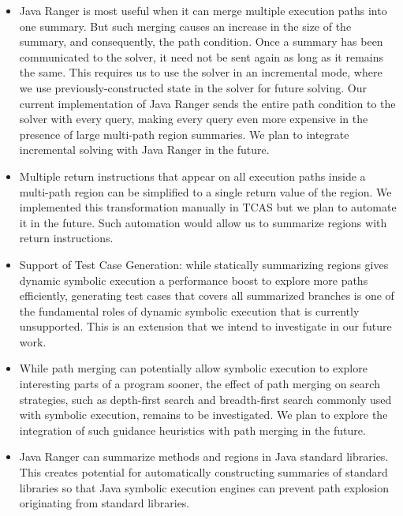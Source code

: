 \begin{itemize}
\item Java Ranger is most useful when it can merge multiple execution paths into one summary. But such merging causes an
increase in the size of the summary, and consequently, the path condition.
%
Once a summary has been communicated to the solver, it need not be sent again as long as it remains the same.
%
This requires us to use the solver in an incremental mode, where we use previously-constructed state in the solver for
future solving.
%
Our current implementation of Java Ranger sends the entire path condition to the solver with every query, making every
query even more expensive in the presence of large multi-path region summaries.
%
We plan to integrate incremental solving with Java Ranger in the future.
%
\item Multiple return instructions that appear on all execution paths inside a multi-path region can be simplified to a
single return value of the region.
%
We implemented this transformation manually in TCAS but we plan to automate it in the future.
%
Such automation would allow us to summarize regions with return instructions.
%
\item Support of Test Case Generation: while statically summarizing regions gives dynamic symbolic execution a
performance boost to explore more paths efficiently, generating test cases that covers all summarized branches is one of
the fundamental roles of dynamic symbolic execution that is currently unsupported.
%
This is an extension that we intend to investigate in our future work.
%
\item While path merging can potentially allow symbolic execution to explore interesting parts of a program sooner, the
effect of path merging on search strategies, such as depth-first search and breadth-first search commonly used with
symbolic execution, remains to be investigated. We plan to explore the integration of such guidance heuristics with path merging in the future.
%
\item Java Ranger can summarize methods and regions in Java standard libraries. This creates potential for automatically
constructing summaries of standard libraries so that Java symbolic execution engines can prevent path explosion
originating from standard libraries.
%
\end{itemize}